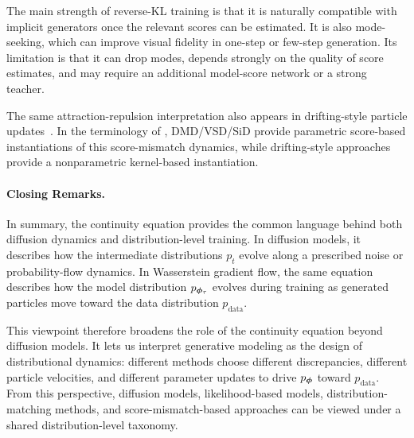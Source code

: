 The main strength of reverse-KL training is that it is naturally compatible with
implicit generators once the relevant scores can be estimated.  It is also
mode-seeking, which can improve visual fidelity in one-step or few-step
generation.  Its limitation is that it can drop modes, depends strongly on the
quality of score estimates, and may require an additional model-score network or
a strong teacher.

The same attraction-repulsion interpretation also appears in drifting-style
particle updates~\citep{weber2023the,deng2026generative}.  In the terminology
of \citet{lai2026unified}, DMD/VSD/SiD provide parametric score-based
instantiations of this score-mismatch dynamics, while drifting-style
approaches~\citep{weber2023the,deng2026generative} provide a
nonparametric kernel-based instantiation.


\paragraph{Closing Remarks.}
In summary, the continuity equation provides the common language behind both
diffusion dynamics and distribution-level training.  In diffusion models, it
describes how the intermediate distributions $p_t$ evolve along a prescribed
noise or probability-flow dynamics.  In Wasserstein gradient flow, the same
equation describes how the model distribution $p_{{\bm{\phi}}_\tau}$ evolves during
training as generated particles move toward the data distribution
$p_{\mathrm{data}}$.

This viewpoint therefore broadens the role of the continuity equation beyond
diffusion models.  It lets us interpret generative modeling as the design of
distributional dynamics: different methods choose different discrepancies,
different particle velocities, and different parameter updates to drive
$p_{{\bm{\phi}}}$ toward $p_{\mathrm{data}}$.  From this perspective, diffusion
models, likelihood-based models, distribution-matching methods, and
score-mismatch-based approaches can be viewed under a shared distribution-level
taxonomy.



\clearpage
\newpage
